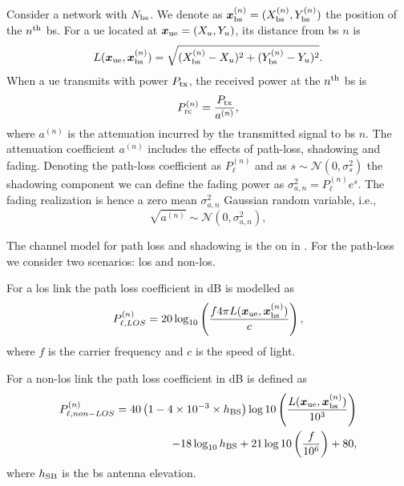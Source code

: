 \documentclass[twocolumns]{IEEEtran}
\begin{document}
Consider a network with $N_{\rm bs}$. We denote as $\bm{x}_{\rm bs}^{(n)} =(X_{\rm bs}^{(n)},Y_{\rm bs}^{(n)})$ the position of the $n^{\rm th}$ \ac{bs}. For a \ac{ue} located at $\bm{x}_{\rm ue}=(X_u,Y_u)$, its distance from \ac{bs} $n$ is
\begin{equation}
    L(\bm{x}_{\rm ue},\bm{x}_{\rm bs}^{(n)}) = \sqrt{(X_{\rm bs}^{(n)}-X_u)^2+(Y_{\rm bs}^{(n)}-Y_u)^2}.
\end{equation}
When a \ac{ue} transmits with power $P_{\rm tx}$, the received power at the $n^{\rm th}$ \ac{bs} is
\begin{equation}\label{eq: rec pow}
    P_{\rm rc}^{(n)}= \frac{P_{\rm tx}}{a^{(n)}},
\end{equation}
where $a^{(n)}$ is the attenuation incurred by the transmitted signal to \ac{bs} $n$. The attenuation coefficient $a^{(n)}$ includes the effects of path-loss, shadowing and fading. Denoting the path-loss coefficient as $P_{\ell}^{(n)}$ and as $s \sim \mathcal{N}(0,\sigma_s^2)$ the shadowing component we can define the fading power as $\sigma_{a,n}^2={P_{\ell}^{(n)}}e^{s}$. The fading realization is hence a zero mean $\sigma_{a,n}^2$ Gaussian random variable, i.e.,
\begin{equation}
    \sqrt{a^{(n)}} \sim \mathcal{N}\left(0,\sigma_{a,n}^2\right),
\end{equation}

The channel model for path loss and shadowing is the on in \cite{3gpp}. For the path-loss we consider two scenarios: \ac{los} and non-\ac{los}.

For a \ac{los} link the path loss coefficient in dB is modelled as
\begin{equation}\label{eq:los}
    P_{\ell,LOS}^{(n)} = 20\log_{10}\left(\frac{f 4\pi L(\bm{x}_{\rm ue},\bm{x}_{\rm bs}^{(n)})}{c}\right),
\end{equation}
where $f$ is the carrier frequency and $c$ is the speed of light.

For a  non-\ac{los} link the path loss coefficient in dB is defined as
\begin{equation}
\begin{split}
    P_{\ell, non-LOS}^{(n)} = 40\left(1-4\times 10^{-3}\times h_{\rm BS}\right)\log10\left (\frac{L(\bm{x}_{\rm ue},\bm{x}_{\rm bs}^{(n)})}{10^3}\right ) \\
    -18\log_{10}h_{\rm BS}
    + 21\log10\left(\frac{f}{10^6}\right) + 80,
    \end{split}
\end{equation}
where $h_{\rm SB}$ is the \ac{bs} antenna elevation.
\end{document}
